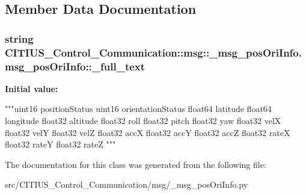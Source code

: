 \subsection{\-Member \-Data \-Documentation}
\hypertarget{class_c_i_t_i_u_s___control___communication_1_1msg_1_1__msg__pos_ori_info_1_1msg__pos_ori_info_a98c881bdb340dc7141635c2583149e6f}{
\subsubsection[{\-\_\-full\-\_\-text}]{\setlength{\rightskip}{0pt plus 5cm}string \-C\-I\-T\-I\-U\-S\-\_\-\-Control\-\_\-\-Communication\-::msg\-::\-\_\-msg\-\_\-pos\-Ori\-Info.\-msg\-\_\-pos\-Ori\-Info\-::\-\_\-full\-\_\-text}}\label{class_c_i_t_i_u_s___control___communication_1_1msg_1_1__msg__pos_ori_info_1_1msg__pos_ori_info_a98c881bdb340dc7141635c2583149e6f}
{\bfseries \-Initial value\-:}
\begin{DoxyCode}
"""uint16 positionStatus
uint16 orientationStatus
float64 latitude
float64 longitude
float32 altitude
float32 roll
float32 pitch
float32 yaw
float32 velX
float32 velY
float32 velZ
float32 accX
float32 accY
float32 accZ
float32 rateX
float32 rateY
float32 rateZ
"""
\end{DoxyCode}


\-The documentation for this class was generated from the following file\-:\begin{DoxyCompactItemize}
\item 
src/\-C\-I\-T\-I\-U\-S\-\_\-\-Control\-\_\-\-Communication/msg/\-\_\-msg\-\_\-pos\-Ori\-Info.\-py\end{DoxyCompactItemize}

